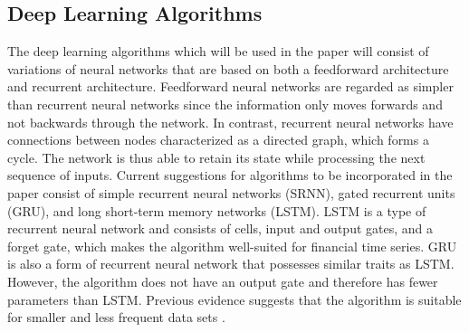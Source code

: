 \subsection{Deep Learning Algorithms}
The deep learning algorithms which will be used in the paper will consist of variations of neural networks that are based on both a feedforward architecture and recurrent architecture. Feedforward neural networks are regarded as simpler than recurrent neural networks since the information only moves forwards and not backwards through the network. In contrast, recurrent neural networks have connections between nodes characterized as a directed graph, which forms a cycle. The network is thus able to retain its state while processing the next sequence of inputs. Current suggestions for algorithms to be incorporated in the paper consist of simple recurrent neural networks (SRNN), gated recurrent units (GRU), and long short-term memory networks (LSTM). LSTM is a type of recurrent neural network and consists of cells, input and output gates, and a forget gate, which makes the algorithm well-suited for financial time series. GRU is also a form of recurrent neural network that possesses similar traits as LSTM. However, the algorithm does not have an output gate and therefore has fewer parameters than LSTM. Previous evidence suggests that the algorithm is suitable for smaller and less frequent data sets \cite{jun}.   
   